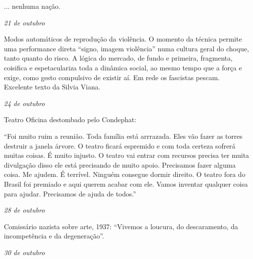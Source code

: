 ... nenhuma nação.

\begin{flushright}
\emph{21 de outubro}
\end{flushright}

Modos automáticos de reprodução da violência. O momento da técnica
permite uma performance direta ``signo, imagem violência'' numa cultura
geral do choque, tanto quanto do risco. A lógica do mercado, de fundo e
primeira, fragmenta, coisifica e espetaculariza toda a dinâmica social,
ao mesmo tempo que a força e exige, como gesto compulsivo de existir aí.
Em rede os fascistas pescam. Excelente texto da Silvia Viana.

\begin{flushright}
\emph{24 de outubro}
\end{flushright}

Teatro Oficina destombado pelo Condephat:

``Foi muito ruim a reunião. Toda família está arrrazada. Eles vão fazer
as torres destruir a janela árvore. O teatro ficará espremido e com toda
certeza sofrerá muitas coisas. É muito injusto. O teatro vai entrar com
recursos precisa ter muita divulgação disso ele está precisando de muito
apoio. Precisamos fazer alguma coisa. Me ajudem. É terrível. Ninguém
consegue dormir direito. O teatro fora do Brasil foi premiado e aqui
querem acabar com ele. Vamos inventar qualquer coisa para ajudar.
Precisamos de ajuda de todos.''

\begin{flushright}
\emph{28 de outubro}
\end{flushright}

Comissário nazista sobre arte, 1937: ``Vivemos a loucura, do
descaramento, da incompetência e da degeneração''.

\pagebreak

\begin{flushright}
\emph{30 de outubro}
\end{flushright}

